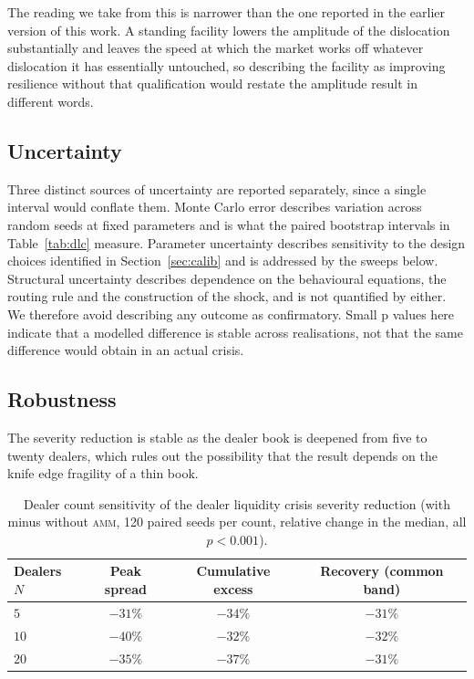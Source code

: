 \documentclass[a4paper,fleqn]{cas-sc}
\newcommand{\acro}[1]{\textsc{\MakeLowercase{#1}}\xspace}
\newcommand{\AMM}{\acro{AMM}}
\begin{document}
The reading we take from this is narrower than the one reported in the earlier version of this work. A standing facility lowers the amplitude of the dislocation substantially and leaves the speed at which the market works off whatever dislocation it has essentially untouched, so describing the facility as improving resilience without that qualification would restate the amplitude result in different words.

\subsection{Uncertainty}

Three distinct sources of uncertainty are reported separately, since a single interval would conflate them. Monte Carlo error describes variation across random seeds at fixed parameters and is what the paired bootstrap intervals in Table~\ref{tab:dlc} measure. Parameter uncertainty describes sensitivity to the design choices identified in Section~\ref{sec:calib} and is addressed by the sweeps below. Structural uncertainty describes dependence on the behavioural equations, the routing rule and the construction of the shock, and is not quantified by either. We therefore avoid describing any outcome as confirmatory. Small p values here indicate that a modelled difference is stable across realisations, not that the same difference would obtain in an actual crisis.

\subsection{Robustness}

The severity reduction is stable as the dealer book is deepened from five to twenty dealers, which rules out the possibility that the result depends on the knife edge fragility of a thin book.

\begin{table}[h]
\centering
\footnotesize
\caption{Dealer count sensitivity of the dealer liquidity crisis severity reduction (with minus without \AMM{}, 120 paired seeds per count, relative change in the median, all $p<0.001$).}
\label{tab:ndealer}
\begin{tabular}{lccc}
\toprule
Dealers $N$ & Peak spread & Cumulative excess & Recovery (common band) \\
\midrule
$5$  & $-31\%$ & $-34\%$ & $-31\%$ \\
$10$ & $-40\%$ & $-32\%$ & $-32\%$ \\
$20$ & $-35\%$ & $-37\%$ & $-31\%$ \\
\bottomrule
\end{tabular}
\end{table}
\end{document}
